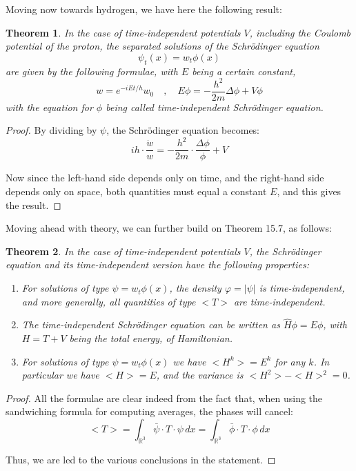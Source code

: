 \documentclass[12pt]{amsbook}
\newtheorem{theorem}{Theorem}[chapter]
\begin{document}
Moving now towards hydrogen, we have here the following result:

\begin{theorem}
In the case of time-independent potentials $V$, including the Coulomb potential of the proton, the separated solutions of the Schr\"odinger equation
$$\psi_t(x)=w_t\phi(x)$$
are given by the following formulae, with $E$ being a certain constant,
$$w=e^{-iEt/h}w_0\quad,\quad E\phi=-\frac{h^2}{2m}\Delta\phi+V\phi$$
with the equation for $\phi$ being called time-independent Schr\"odinger equation.
\end{theorem}

\begin{proof}
By dividing by $\psi$, the Schr\"odinger equation becomes:
$$ih\cdot\frac{\dot{w}}{w}=-\frac{h^2}{2m}\cdot\frac{\Delta\phi}{\phi}+V$$

Now since the left-hand side depends only on time, and the right-hand side depends only on space, both quantities must equal a constant $E$, and this gives the result.
\end{proof}

Moving ahead with theory, we can further build on Theorem 15.7, as follows:

\begin{theorem}
In the case of time-independent potentials $V$, the Schr\"odinger equation and its time-independent version have the following properties:
\begin{enumerate}
\item For solutions of type $\psi=w_t\phi(x)$, the density $\varphi=|\psi|$ is time-independent, and more generally, all quantities of type $<T>$ are time-independent.

\item The time-independent Schr\"odinger equation can be written as $\widehat{H}\phi=E\phi$, with $H=T+V$ being the total energy, of Hamiltonian.

\item For solutions of type $\psi=w_t\phi(x)$ we have $<H^k>=E^k$ for any $k$. In particular we have $<H>=E$, and the variance is $<H^2>-<H>^2=0$.
\end{enumerate}
\end{theorem}

\begin{proof}
All the formulae are clear indeed from the fact that, when using the sandwiching formula for computing averages, the phases will cancel:
$$<T>=\int_{\mathbb R^3}\bar{\psi}\cdot T\cdot\psi\,dx
=\int_{\mathbb R^3}\bar{\phi}\cdot T\cdot\phi\,dx$$

Thus, we are led to the various conclusions in the statement.
\end{proof}
\end{document}

